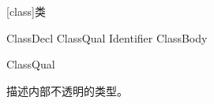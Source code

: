 
[class]{类}

\begin{bnf}{ClassDecl}
    ClassQual\bnfs {} Identifier ClassBody
\end{bnf}

\begin{bnf}{ClassQual}
\end{bnf}

\pnum
{}描述内部不透明的类型。